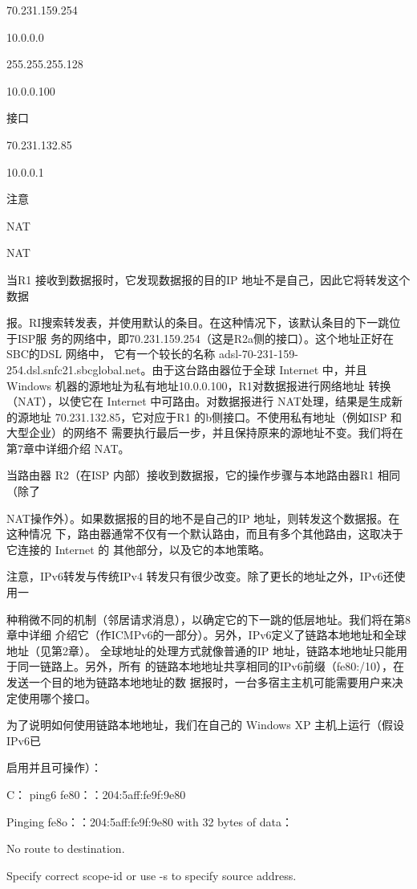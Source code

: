 70.231.159.254

10.0.0.0

255.255.255.128

10.0.0.100

接口

70.231.132.85

10.0.0.1

注意

NAT

NAT

当R1 接收到数据报时，它发现数据报的目的IP 地址不是自己，因此它将转发这个数据

报。RI搜索转发表，并使用默认的条目。在这种情况下，该默认条目的下一跳位于ISP服
务的网络中，即70.231.159.254（这是R2a侧的接口）。这个地址正好在 SBC的DSL 网络中，
它有一个较长的名称 adsl-70-231-159-254.dsl.snfc21.sbcglobal.net。由于这台路由器位于全球
Internet 中，并且 Windows 机器的源地址为私有地址10.0.0.100，R1对数据报进行网络地址
转换（NAT），以使它在 Internet 中可路由。对数据报进行 NAT处理，结果是生成新的源地址
70.231.132.85，它对应于R1 的b侧接口。不使用私有地址（例如ISP 和大型企业）的网络不
需要执行最后一步，并且保持原来的源地址不变。我们将在第7章中详细介绍 NAT。

当路由器 R2（在ISP 内部）接收到数据报，它的操作步骤与本地路由器R1 相同（除了

NAT操作外）。如果数据报的目的地不是自己的IP 地址，则转发这个数据报。在这种情况
下，路由器通常不仅有一个默认路由，而且有多个其他路由，这取决于它连接的 Internet 的
其他部分，以及它的本地策略。

注意，IPv6转发与传统IPv4 转发只有很少改变。除了更长的地址之外，IPv6还使用一

种稍微不同的机制（邻居请求消息），以确定它的下一跳的低层地址。我们将在第8章中详细
介绍它（作ICMPv6的一部分）。另外，IPv6定义了链路本地地址和全球地址（见第2章）。
全球地址的处理方式就像普通的IP 地址，链路本地地址只能用于同一链路上。另外，所有
的链路本地地址共享相同的IPv6前缀（fe80:/10），在发送一个目的地为链路本地地址的数
据报时，一台多宿主主机可能需要用户来决定使用哪个接口。

为了说明如何使用链路本地地址，我们在自己的 Windows XP 主机上运行（假设IPv6已

启用并且可操作）：

C：\> ping6 fe80：：204:5aff:fe9f:9e80

Pinging fe8o：：204:5aff:fe9f:9e80 with 32 bytes of data：

No route to destination.

Specify correct scope-id or use -s to specify source address.

